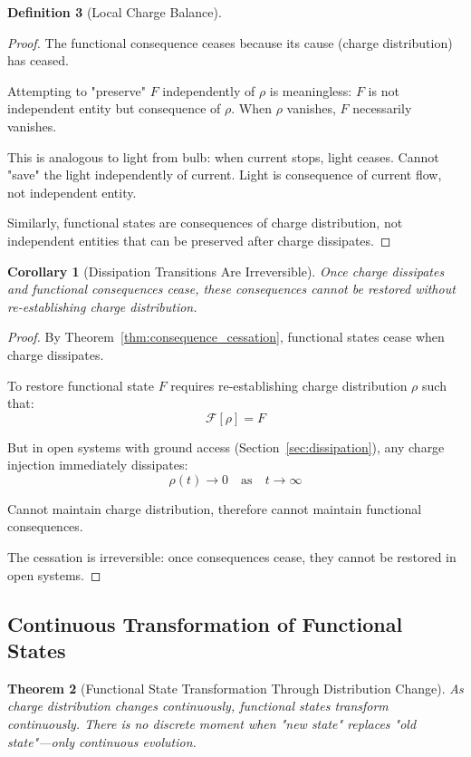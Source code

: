 \documentclass[12pt,a4paper]{article}
\theoremstyle{plain}
\newtheorem{theorem}{Theorem}[section]
\newtheorem{corollary}[theorem]{Corollary}
\theoremstyle{definition}
\newtheorem{definition}[theorem]{Definition}
\theoremstyle{remark}
\begin{document}
\begin{definition}[Local Charge Balance]
\begin{proof}
The functional consequence ceases because its cause (charge distribution) has ceased.

Attempting to "preserve" $F$ independently of $\rho$ is meaningless: $F$ is not independent entity but consequence of $\rho$. When $\rho$ vanishes, $F$ necessarily vanishes.

This is analogous to light from bulb: when current stops, light ceases. Cannot "save" the light independently of current. Light is consequence of current flow, not independent entity.

Similarly, functional states are consequences of charge distribution, not independent entities that can be preserved after charge dissipates.
\end{proof}

\begin{corollary}[Dissipation Transitions Are Irreversible]
\label{cor:dissipation_irreversible_consequence}
Once charge dissipates and functional consequences cease, these consequences cannot be restored without re-establishing charge distribution.
\end{corollary}

\begin{proof}
By Theorem~\ref{thm:consequence_cessation}, functional states cease when charge dissipates.

To restore functional state $F$ requires re-establishing charge distribution $\rho$ such that:
\begin{equation}
\mathcal{F}[\rho] = F
\end{equation}

But in open systems with ground access (Section~\ref{sec:dissipation}), any charge injection immediately dissipates:
\begin{equation}
\rho(t) \to 0 \quad \text{as} \quad t \to \infty
\end{equation}

Cannot maintain charge distribution, therefore cannot maintain functional consequences.

The cessation is irreversible: once consequences cease, they cannot be restored in open systems.
\end{proof}

\subsection{Continuous Transformation of Functional States}

\begin{theorem}[Functional State Transformation Through Distribution Change]
\label{thm:continuous_transformation}
As charge distribution changes continuously, functional states transform continuously. There is no discrete moment when "new state" replaces "old state"—only continuous evolution.
\end{theorem}


\end{definition}
\end{document}
